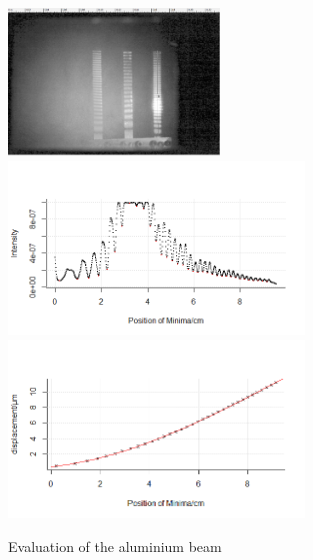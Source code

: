 \begin{figure}
	\centering
	\includegraphics[width=0.5\textwidth]{../figures/Stab1gwid.png}
	\includegraphics[width=0.7\textwidth]{../figures/Stab1R1.png}
	\includegraphics[width=0.7\textwidth]{../figures/Stab1R2.png}
	\caption{Evaluation of the aluminium beam}
\end{figure}